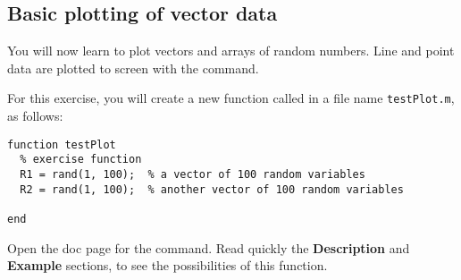 \documentclass{article}
\begin{document}
\subsection*{Basic plotting of vector data}

You will now learn to plot vectors and arrays of random numbers.
Line and point data are plotted to screen with the  command.

For this exercise, you will create a new function called  in a file name \verb|testPlot.m|, as follows:
\begin{lstlisting}
function testPlot
  % exercise function
  R1 = rand(1, 100);  % a vector of 100 random variables
  R2 = rand(1, 100);  % another vector of 100 random variables

end
\end{lstlisting}

Open the doc page for the  command.
Read quickly the \textbf{Description} and \textbf{Example} sections, to see the possibilities of this function.
\end{document}
